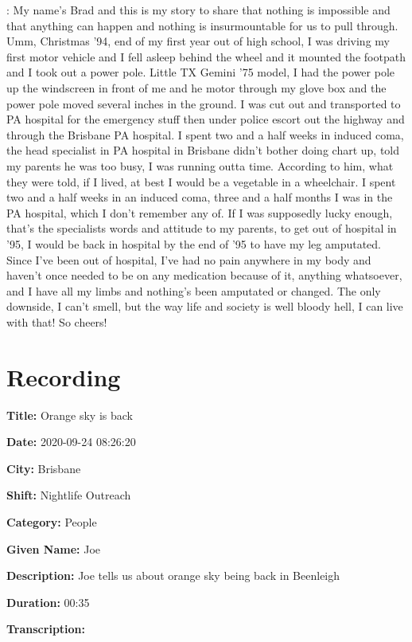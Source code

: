 {\begin{drama}
    \bradspeaks: My name's Brad and this is my story to share that nothing is impossible and that anything can happen and nothing is insurmountable for us to pull through. Umm, Christmas '94, end of my first year out of high school, I was driving my first motor vehicle and I fell asleep behind the wheel and it mounted the footpath and I took out a power pole. Little TX Gemini '75 model, I had the power pole up the windscreen in front of me and he motor through my glove box and the power pole moved several inches in the ground. I was cut out and transported to PA hospital for the emergency stuff then under police escort out the highway and through the Brisbane PA hospital. I spent two and a half weeks in induced coma, the head specialist in PA hospital in Brisbane didn't bother doing chart up, told my parents he was too busy, I was running outta time. According to him, what they were told, if I lived, at best I would be a vegetable in a wheelchair. I spent two and a half weeks in an induced coma, three and a half months I was in the PA hospital, which I don't remember any of. If I was supposedly lucky enough, that's the specialists words and attitude to my parents, to get out of hospital in '95, I would be back in hospital by the end of '95 to have my leg amputated. Since I've been out of hospital, I've had no pain anywhere in my body and haven't once needed to be on any medication because of it, anything whatsoever, and I have all my limbs and nothing's been amputated or changed. The only downside, I can't smell, but the way life and society is well bloody hell, I can live with that! So cheers!
\end{drama}

\tocless\section{Recording }

\textbf{Title:} Orange sky is back

\textbf{Date:} 2020-09-24 08:26:20

\textbf{City:} Brisbane

\textbf{Shift:} Nightlife Outreach

\textbf{Category:} People

\textbf{Given Name:} Joe

\textbf{Description:} Joe tells us about orange sky being back in Beenleigh

\textbf{Duration:} 00:35

\textbf{Transcription:}

}
